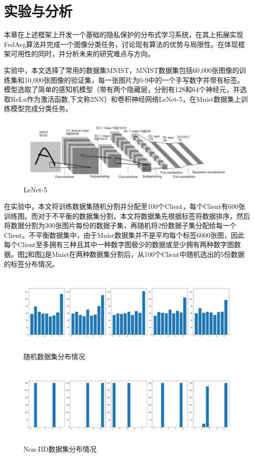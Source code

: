 \documentclass[zihao = -4,cn]{oucart}
\begin{document}
\section{实验与分析}
本章在上述框架上开发一个基础的隐私保护的分布式学习系统，在其上拓展实现FedAvg算法并完成一个图像分类任务，讨论现有算法的优势与局限性。在体现框架可用性的同时，并分析未来的研究难点与方向。\par
实验中，本文选择了常用的数据集MNIST，MNIST数据集包括60,000张图像的训练集和10,000张图像的验证集，每一张图片为0-9中的一个手写数字并带有标签。模型选取了简单的感知机模型（带有两个隐藏层，分别有128和64个神经元，并选取ReLu作为激活函数,下文称2NN）和卷积神经网络LeNet-5\cite{lecun2015lenet}，在Mnist数据集上训练模型完成分类任务。\par

\begin{figure}[h]
	\centering %
	\includegraphics[scale=0.4]{assets/LeNet}
	\caption{LeNet-5}
	\label{fig:lenet}
\end{figure}

在实验中，本文将训练数据集随机分割并分配至100个Client，每个Client有600张训练图。而对于不平衡的数据集分割，本文将数据集先根据标签将数据排序，然后将数据分割为300张图片每份的数据子集，再随机将2份数据子集分配给每一个Client。不平衡数据集中，由于Mnist数据集并不是平均每个标签6000张图，因此每个Client至多拥有三种且其中一种数字图极少的数据或至少拥有两种数字图数据。图\ref{fig:random_data}和图\ref{fig:non-iid}是Mnist在两种数据集分割后，从100个Client中随机选出的5份数据的标签分布情况。\par
\begin{figure}[h]
	\centering %
	\includegraphics[width=15cm,height=4cm]{assets/random_data}
	\caption{随机数据集分布情况}
	\label{fig:random_data}
\end{figure}
\begin{figure}[h]
	\centering %
	\includegraphics[width=15cm,height=4cm]{assets/Non-IID}
	\caption{Non-IID数据集分布情况}
	\label{fig:non-iid}
\end{figure}
\end{document}
